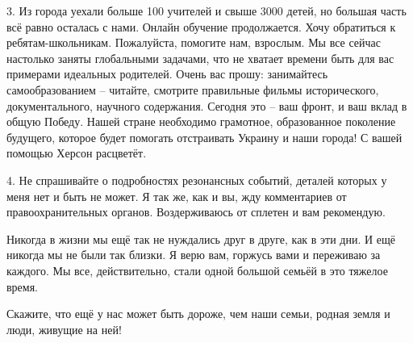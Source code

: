3. Из города уехали больше 100 учителей и свыше 3000 детей, но большая часть
всё равно осталась с нами. Онлайн обучение продолжается. Хочу обратиться к
ребятам-школьникам. Пожалуйста, помогите нам, взрослым. Мы все сейчас настолько
заняты глобальными задачами, что не хватает времени быть для вас примерами
идеальных родителей. Очень вас прошу: занимайтесь самообразованием – читайте,
смотрите правильные фильмы исторического, документального, научного содержания.
Сегодня это – ваш фронт, и ваш вклад в общую Победу. Нашей стране необходимо
грамотное, образованное поколение будущего, которое будет помогать отстраивать
Украину и наши города! С вашей помощью Херсон расцветёт. 

4. Не спрашивайте о подробностях резонансных событий, деталей которых у меня
нет и быть не может. Я так же, как и вы, жду комментариев от правоохранительных
органов. Воздерживаюсь от сплетен и вам рекомендую.

Никогда в жизни мы ещё так не нуждались друг в друге, как в эти дни. И ещё
никогда мы не были так близки. Я верю вам, горжусь вами и переживаю за каждого.
Мы все, действительно, стали одной большой семьёй в это тяжелое время. 

Скажите, что ещё у нас может быть дороже, чем наши семьи, родная земля и люди,
живущие на ней!

